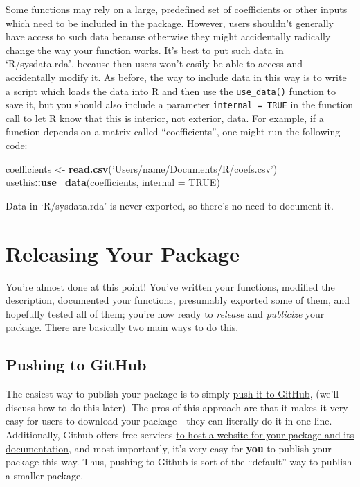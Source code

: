\documentclass[]{book}
\newenvironment{Shaded}{\begin{snugshade}}{\end{snugshade}}
\newcommand{\KeywordTok}[1]{\textcolor[rgb]{0.13,0.29,0.53}{\textbf{#1}}}
\newcommand{\DataTypeTok}[1]{\textcolor[rgb]{0.13,0.29,0.53}{#1}}
\newcommand{\StringTok}[1]{\textcolor[rgb]{0.31,0.60,0.02}{#1}}
\newcommand{\OtherTok}[1]{\textcolor[rgb]{0.56,0.35,0.01}{#1}}
\newcommand{\OperatorTok}[1]{\textcolor[rgb]{0.81,0.36,0.00}{\textbf{#1}}}
\newcommand{\NormalTok}[1]{#1}
\begin{document}
Some functions may rely on a large, predefined set of coefficients or
other inputs which need to be included in the package. However, users
shouldn't generally have access to such data because otherwise they
might accidentally radically change the way your function works. It's
best to put such data in `R/sysdata.rda', because then users won't
easily be able to access and accidentally modify it. As before, the way
to include data in this way is to write a script which loads the data
into R and then use the \texttt{use\_data()} function to save it, but
you should also include a parameter \texttt{internal\ =\ TRUE} in the
function call to let R know that this is interior, not exterior, data.
For example, if a function depends on a matrix called ``coefficients'',
one might run the following code:

\begin{Shaded}
\begin{Highlighting}[]
\NormalTok{coefficients <-}\StringTok{ }\KeywordTok{read.csv}\NormalTok{(}\StringTok{'Users/name/Documents/R/coefs.csv'}\NormalTok{)}
\NormalTok{usethis}\OperatorTok{::}\KeywordTok{use_data}\NormalTok{(coefficients, }\DataTypeTok{internal =} \OtherTok{TRUE}\NormalTok{)}
\end{Highlighting}
\end{Shaded}

Data in `R/sysdata.rda' is never exported, so there's no need to
document it.

\hypertarget{releasing-your-package}{\section{Releasing Your
Package}\label{releasing-your-package}}

You're almost done at this point! You've written your functions,
modified the description, documented your functions, presumably exported
some of them, and hopefully tested all of them; you're now ready to
\emph{release} and \emph{publicize} your package. There are basically
two main ways to do this.

\subsection{Pushing to GitHub}\label{pushing-to-github}

The easiest way to publish your package is to simply
\href{./version-control}{push it to GitHub}, (we'll discuss how to do
this later). The pros of this approach are that it makes it very easy
for users to download your package - they can literally do it in one
line. Additionally, Github offers free services
\href{https://pages.github.com/}{to host a website for your package and
its documentation}, and most importantly, it's very easy for
\textbf{you} to publish your package this way. Thus, pushing to Github
is sort of the ``default'' way to publish a smaller package.
\end{document}
